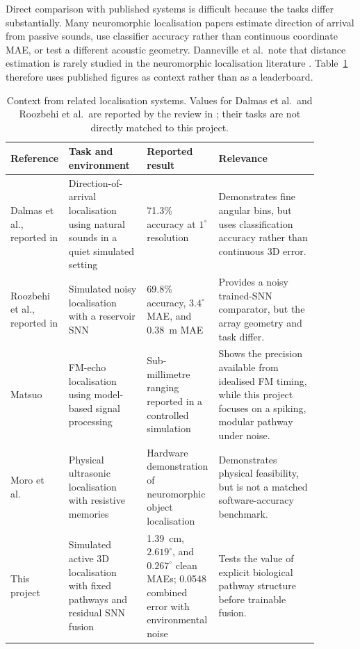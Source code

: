 Direct comparison with published systems is difficult because the tasks differ substantially. Many neuromorphic localisation papers estimate direction of arrival from passive sounds, use classifier accuracy rather than continuous coordinate MAE, or test a different acoustic geometry. Danneville et al.\ note that distance estimation is rarely studied in the neuromorphic localisation literature \cite{Danneville2024ASystems}. Table~\ref{tab:literature_context} therefore uses published figures as context rather than as a leaderboard.

\begin{table}[H]
    \centering
    \caption{Context from related localisation systems. Values for Dalmas et al.\ and Roozbehi et al.\ are reported by the review in \cite{Danneville2024ASystems}; their tasks are not directly matched to this project.}
    \label{tab:literature_context}
    \small
    \begin{tabular}{p{0.1\linewidth}p{0.25\linewidth}p{0.21\linewidth}p{0.32\linewidth}}
        \toprule
        Reference & Task and environment & Reported result & Relevance \\
        \midrule
        Dalmas et al., reported in \cite{Danneville2024ASystems} & Direction-of-arrival localisation using natural sounds in a quiet simulated setting & 71.3\% accuracy at $1^\circ$ resolution & Demonstrates fine angular bins, but uses classification accuracy rather than continuous 3D error. \\
        \midrule
        Roozbehi et al., reported in \cite{Danneville2024ASystems} & Simulated noisy localisation with a reservoir SNN & 69.8\% accuracy, $3.4^\circ$ MAE, and 0.38~m MAE & Provides a noisy trained-SNN comparator, but the array geometry and task differ. \\
        \midrule
        Matsuo \cite{Matsuo2013EcholocationSound} & FM-echo localisation using model-based signal processing & Sub-millimetre ranging reported in a controlled simulation & Shows the precision available from idealised FM timing, while this project focuses on a spiking, modular pathway under noise. \\
        \midrule
        Moro et al.\ \cite{Moro2022NeuromorphicTransducers} & Physical ultrasonic localisation with resistive memories & Hardware demonstration of neuromorphic object localisation & Demonstrates physical feasibility, but is not a matched software-accuracy benchmark. \\
        \midrule
        This project & Simulated active 3D localisation with fixed pathways and residual SNN fusion & 1.39~cm, $2.619^\circ$, and $0.267^\circ$ clean MAEs; 0.0548 combined error with environmental noise & Tests the value of explicit biological pathway structure before trainable fusion. \\
        \bottomrule
    \end{tabular}
\end{table}

